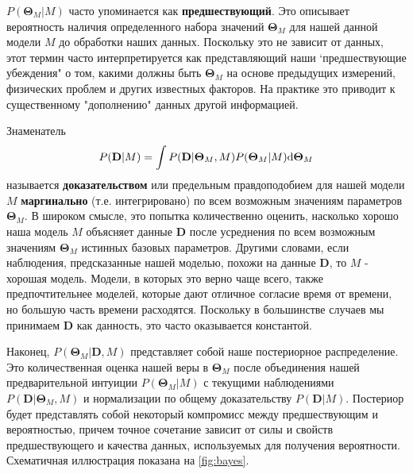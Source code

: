 \documentclass[12pt, titlepage]{article}
\newcommand{\deriv}{\ensuremath{{\rm d}}}  %
\newcommand{\params}{\ensuremath{\boldsymbol\Theta}}
\newcommand{\data}{\ensuremath{\mathbf{D}}}
\begin{document}
$P(\params_M | M)$ часто упоминается как \textbf{предшествующий}. Это описывает вероятность наличия определенного набора значений $\params_M$ для нашей данной модели $M$ до обработки наших данных. Поскольку это не зависит от данных, этот термин часто интерпретируется как представляющий наши `предшествующие убеждения" о том, какими должны быть $\params_M$ на основе предыдущих измерений, физических проблем и других известных факторов. На практике это приводит к существенному "дополнению" данных другой информацией.

Знаменатель
\begin{equation}
    P(\data | M) = \int P(\data | \params_M, M) P(\params_M | M) \deriv \params_M
\end{equation}
называется \textbf{доказательством} или предельным правдоподобием для нашей модели $M$ \textbf{маргинально} (т.е. интегрировано) по всем возможным значениям параметров $\params_M$. В широком смысле, это попытка количественно оценить, насколько хорошо наша модель $M$ объясняет данные $\data$ после усреднения по всем возможным значениям $\params_M$ истинных базовых параметров. Другими словами, если наблюдения, предсказанные нашей моделью, похожи на данные $\data$, то $M$ - хорошая модель. Модели, в которых это верно чаще всего, также предпочтительнее моделей, которые дают отличное согласие время от времени, но большую часть времени расходятся. Поскольку в большинстве случаев мы принимаем $\data$ как данность, это часто оказывается константой.

Наконец, $P(\params_M | \data, M)$ представляет собой наше постериорное распределение. Это количественная оценка нашей веры в $\params_M$ после объединения нашей предварительной интуиции $P(\params_M|M)$ с текущими наблюдениями $P(\data|\params_M,M)$ и нормализации по общему доказательству $P(\data|M)$. Постериор будет представлять собой некоторый компромисс между предшествующим и вероятностью, причем точное сочетание зависит от силы и свойств предшествующего и качества данных, используемых для получения вероятности. Схематичная иллюстрация показана на {\color{red} \autoref{fig:bayes}}.
\end{document}
